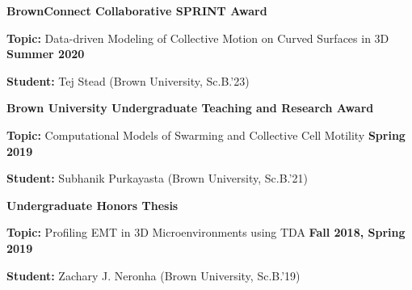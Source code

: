 \documentclass[margin,line]{res}
\newenvironment{list1}{
  \begin{list}{\ding{113}}{
      \setlength{\itemsep}{0in}
      \setlength{\parsep}{0in} \setlength{\parskip}{0in}
      \setlength{\topsep}{0in} \setlength{\partopsep}{0in}
      \setlength{\leftmargin}{0.17in}}}{\end{list}}
\begin{document}
\begin{resume}

{\bf BrownConnect Collaborative SPRINT Award}
\vspace*{.3cm}
\begin{list1}
\setlength\itemsep{0.2em}
\item[] {\bf Topic:} Data-driven Modeling of Collective Motion on Curved Surfaces in 3D \hfill {\bf \small Summer 2020}
\item[] {\bf Student:} Tej Stead (Brown University, Sc.B.'23)
\end{list1}

{\bf Brown University Undergraduate Teaching and Research Award}
\vspace*{.3cm}
\begin{list1}
\setlength\itemsep{0.2em}
\item[] {\bf Topic:} Computational Models of Swarming and Collective Cell Motility \hfill {\bf \small Spring 2019}
\item[] {\bf Student:} Subhanik Purkayasta (Brown University, Sc.B.'21)
\end{list1}

{\bf Undergraduate Honors Thesis}
\vspace*{.3cm}
\begin{list1}
\setlength\itemsep{0.2em}
\item[] {\bf Topic:} Profiling EMT in 3D Microenvironments using TDA \hfill {\bf \small Fall 2018, Spring 2019}
\item[] {\bf Student:} Zachary J. Neronha (Brown University, Sc.B.'19) 
\end{list1}


\end{resume}
\end{document}
